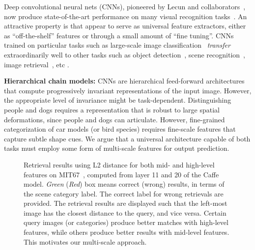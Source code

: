 \documentclass[10pt,twocolumn,letterpaper]{article}
\begin{document}
Deep convolutional neural nets (CNNs), pioneered by Lecun and collaborators~\cite{lecun1998gradient}, now produce state-of-the-art performance on many visual recognition tasks~\cite{AlexNet, overfeat, veryDeep, GoogLeNet, nin}. An attractive property is that appear to serve as universal feature extractors, either as ``off-the-shelf'' features or through a small amount of ``fine tuning''. CNNs trained on particular tasks such as large-scale image classification~\cite{ImageNet} {\em transfer} extraordinarily well to other tasks such as object detection~\cite{rcnn}, scene recognition~\cite{zhoulearning}, image retrieval~\cite{Gong14}, etc \cite{cnn_baseline}.

{\bf Hierarchical chain models:}  CNNs are 
hierarchical feed-forward architectures that compute progressively invariant representations of the input image. However, the appropriate level of invariance might be task-dependent. Distinguishing people and dogs requires a representation that is robust to large spatial deformations, since people and dogs can articulate. However, fine-grained categorization of car models (or bird species) requires fine-scale features that capture subtle shape cues. We argue that a universal architecture capable of both tasks must employ some form of multi-scale features for output prediction.

\begin{figure}
\centering

\caption{Retrieval results using L2 distance for both mid- and high-level features on MIT67~\cite{MIT67}, computed from layer 11 and 20 of the Caffe model. \textit{Green} (\textit{Red}) box means correct (wrong) results, in terms of the scene category label. The correct label for wrong retrievals are provided. The retrieval results are displayed such that the left-most image has the closest distance to the query, and vice versa. Certain query images (or categories) produce better matches with high-level features, while others produce better results with mid-level features. This motivates our multi-scale approach.}
\label{fig:moti}
\end{figure}
\end{document}
